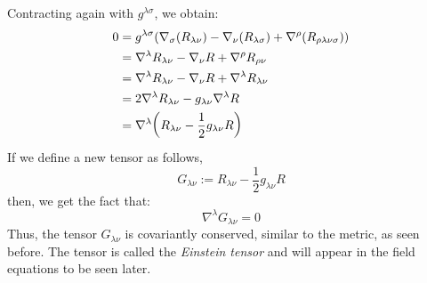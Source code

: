Contracting again with $g^{\lambda\sigma}$, we obtain:
\begin{align*}
    0&=g^{\lambda\sigma}(\nabla_{\sigma}(R_{\lambda\nu}) - \nabla_{\nu}(R_{\lambda \sigma})+\nabla^\rho(R_{{\rho}{\lambda}{\nu}{\sigma}}))\\
    &= \nabla^\lambda R_{\lambda\nu} -\nabla_{\nu} R + \nabla^\rho R_{\rho\nu}\\
    &=\nabla^\lambda R_{\lambda\nu} -\nabla_{\nu} R + \nabla^\lambda R_{\lambda\nu}\\
    &=2\nabla^\lambda R_{\lambda\nu}  - g_{\lambda \nu}\nabla^{\lambda}R\\
    &=\nabla^\lambda \qty( R_{\lambda\nu}  - \frac{1}{2} g_{\lambda \nu}R)
\end{align*}
If we define a new tensor as follows, 
$$G_{\lambda\nu}:= R_{\lambda\nu}  - \frac{1}{2} g_{\lambda \nu}R$$
then, we get the fact that:
$$\nabla^\lambda G_{\lambda\nu} =0$$
Thus, the tensor $G_{\lambda\nu}$ is covariantly conserved, similar to the metric, as seen before. The tensor is called the \textit{Einstein tensor} and will appear in the field equations to be seen later. 